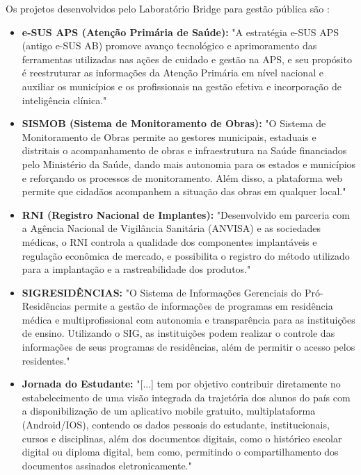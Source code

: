 \documentclass[
    12pt,       %
    openright,      %
    twoside,      %
    a4paper,      %
    english,      %
    french,       %
    spanish,      %
    brazil,       %
    ]{abntex2}
\begin{document}
Os projetos desenvolvidos pelo Laboratório Bridge para gestão pública são \cite{Bridge:2022}:
\begin{itemize}
    \item \textbf{e-SUS APS (Atenção Primária de Saúde):} "A estratégia e-SUS APS (antigo e-SUS AB) promove avanço tecnológico e aprimoramento das ferramentas utilizadas nas ações de cuidado e gestão na APS, e seu propósito é reestruturar as informações da Atenção Primária em nível nacional e auxiliar os municípios e os profissionais na gestão efetiva e incorporação de inteligência clínica."
    
    \item \textbf{SISMOB (Sistema de Monitoramento de Obras):} "O Sistema de Monitoramento de Obras permite ao gestores municipais, estaduais e distritais o acompanhamento de obras e infraestrutura na Saúde financiados pelo Ministério da Saúde, dando mais autonomia para os estados e municípios e reforçando os processos de monitoramento. Além disso, a plataforma web permite que cidadãos acompanhem a situação das obras em qualquer local."
    
    \item \textbf{RNI (Registro Nacional de Implantes):} "Desenvolvido em parceria com a Agência Nacional de Vigilância Sanitária (ANVISA) e as sociedades médicas, o RNI controla a qualidade dos componentes implantáveis e regulação econômica de mercado, e possibilita o registro do método utilizado para a implantação e a rastreabilidade dos produtos."
    
    \item \textbf{SIGRESIDÊNCIAS:} "O Sistema de Informações Gerenciais do Pró-Residências permite a gestão de informações de programas em residência médica e multiprofissional com autonomia e transparência para as instituições de ensino. Utilizando o SIG, as instituições podem realizar o controle das informações de seus programas de residências, além de permitir o acesso pelos residentes."
    
    \item \textbf{Jornada do Estudante:} "[...] tem por objetivo contribuir diretamente no estabelecimento de uma visão integrada da trajetória dos alunos do país com a disponibilização de um aplicativo mobile gratuito, multiplataforma (Android/IOS), contendo os dados pessoais do estudante, institucionais, cursos e disciplinas, além dos documentos digitais, como o histórico escolar digital ou diploma digital, bem como, permitindo o compartilhamento dos documentos assinados eletronicamente." \cite{MEC:2021}
\end{itemize}
\end{document}
